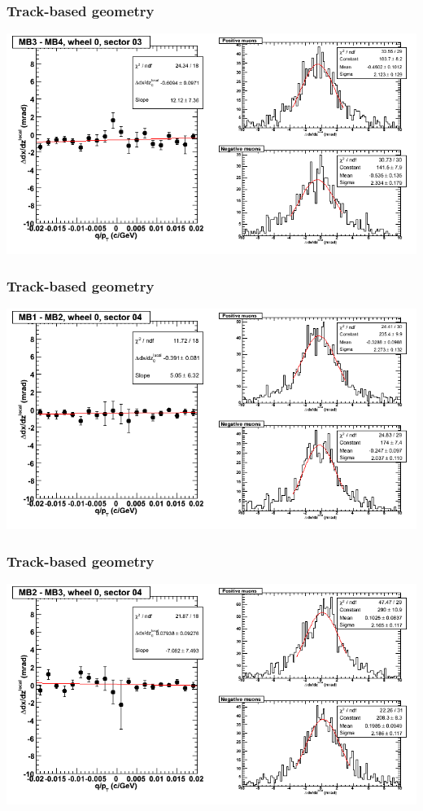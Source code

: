 \documentclass[compress]{beamer}
\begin{document}
\begin{frame}
\frametitle{Track-based geometry}
\includegraphics[width=\linewidth]{NOV4_segdiffs/dt13_slope_C_03_34.png}
\end{frame}

\begin{frame}
\frametitle{Track-based geometry}
\includegraphics[width=\linewidth]{NOV4_segdiffs/dt13_slope_C_04_12.png}
\end{frame}

\begin{frame}
\frametitle{Track-based geometry}
\includegraphics[width=\linewidth]{NOV4_segdiffs/dt13_slope_C_04_23.png}
\end{frame}
\end{document}
